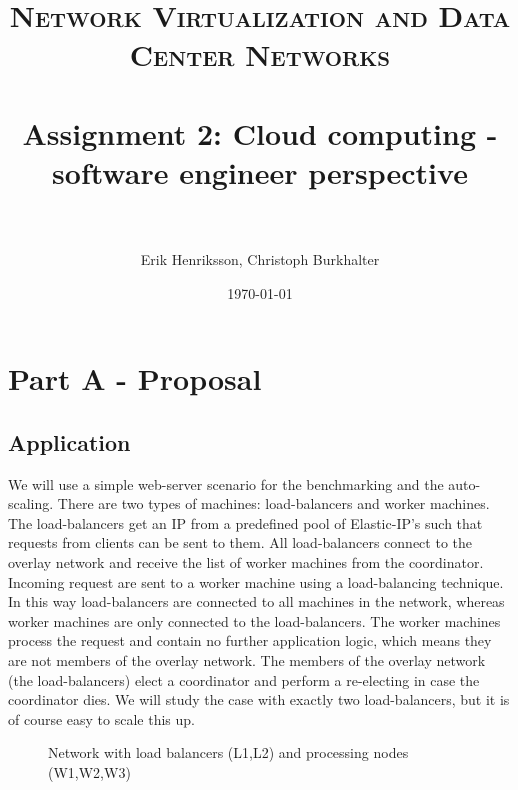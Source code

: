 \documentclass[paper=a4, fontsize=11pt]{scrartcl} %
\title{	
\normalfont \normalsize 
\textsc{Network Virtualization and Data Center Networks} \\ [25pt] %
\horrule{0.5pt} \\[0.4cm] %
\huge Assignment 2: Cloud computing - software engineer perspective\\ %
\horrule{2pt} \\[0.5cm] %
}
\author{Erik Henriksson, Christoph Burkhalter} %
\date{\normalsize\today} %
\numberwithin{equation}{section} %
\numberwithin{figure}{section} %
\numberwithin{table}{section} %
\begin{document}
\maketitle %

\section{Part A - Proposal}

\subsection{Application}


We will use a simple web-server scenario for the benchmarking and the auto-scaling. There are two types of machines: load-balancers and worker machines. The load-balancers get an IP from a predefined pool of Elastic-IP's such that requests from clients can be sent to them. All load-balancers connect to the overlay network and receive the list of worker machines from the coordinator. Incoming request are sent to a worker machine using a load-balancing technique. In this way load-balancers are connected to all machines in the network, whereas worker machines are only connected to the load-balancers.
The worker machines process the request and contain no further application logic, which means they are not members of the overlay network.
The members of the overlay network (the load-balancers) elect a coordinator and perform a re-electing in case the coordinator dies. We will study the case with exactly two load-balancers, but it is of course easy to scale this up.


\begin{figure}[H]
\begin{center}
\end{center}

\caption{Network with load balancers (L1,L2) and processing nodes (W1,W2,W3)}
\end{figure}
\end{document}
